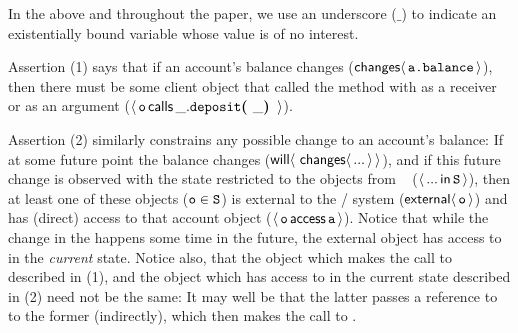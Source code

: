 \noindent 
In the above and throughout the paper, we use an underscore ($\_$) to indicate an existentially bound variable whose 
value is of no interest.

\vspace{.2cm}

Assertion (1) %
says that if   an account's balance changes
($\Changes{\prg{a.balance}}$),
then there must be some client object 
that %
called the  method with  as a receiver or as an argument 
($\Calls{\prg{o}} {\prg{deposit}} {\_} {\_}$).
 
Assertion (2) similarly constrains any possible change to an 
account's balance: 
If at some future point the balance changes  (${\Future{\,\Changes{...}}}$),  %
and if this future change is observed with the state restricted to the objects from \SF~ (\ie $\Using{...}{\prg{S}}$), then 
at least one of these objects ($\prg{o}\in\SF$) is external to the / system ($\External{\prg{o}}$) and 
has (direct) access to that account object
($\CanAccess{\prg{o}}{\prg{a}}$).
Notice that while the change in the  happens some time in the future,
the external object  has access to  in the \emph{current} state.
Notice also, that the object which makes the call to  described in (1), and the object which 
has access to  in the current state described in (2) need not be the same: It may well be that the
latter passes  a reference to  to the former (indirectly), which then makes the call
to .

